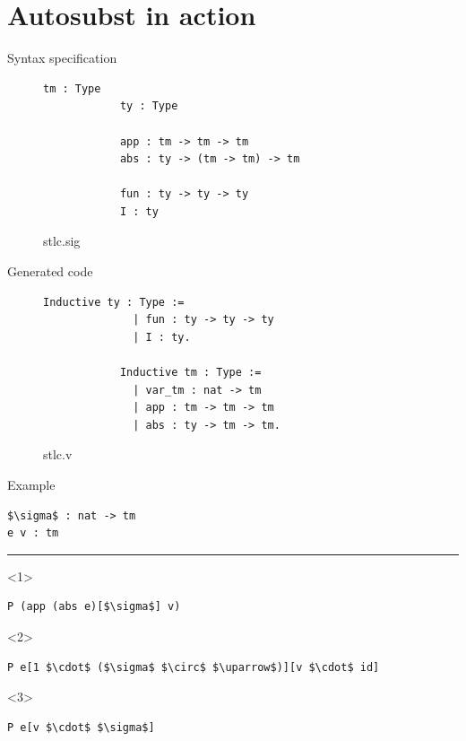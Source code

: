 \documentclass[17pt,aspectratio=169]{beamer}
\begin{document}
\section{Autosubst in action}

\begin{frame}[fragile]{Syntax specification}
    \begin{figure}[H]
        \centering
        \begin{lstlisting}[language={[Objective]Caml},basicstyle=\footnotesize\ttfamily,keywordstyle=\bfseries]
            tm : Type
            ty : Type

            app : tm -> tm -> tm
            abs : ty -> (tm -> tm) -> tm

            fun : ty -> ty -> ty
            I : ty
        \end{lstlisting}
        \caption{stlc.sig}
    \end{figure}
\end{frame}

\begin{frame}[fragile]{Generated code}
    \begin{figure}[H]
        \centering
        \begin{lstlisting}[language={[Objective]Caml},basicstyle=\footnotesize\ttfamily,keywordstyle=\bfseries]
            Inductive ty : Type :=
              | fun : ty -> ty -> ty
              | I : ty.

            Inductive tm : Type :=
              | var_tm : nat -> tm
              | app : tm -> tm -> tm
              | abs : ty -> tm -> tm.
        \end{lstlisting}
        \caption{stlc.v}
    \end{figure}
\end{frame}

\begin{frame}[fragile]{Example}
    \begin{lstlisting}[mathescape=true,basicstyle=\footnotesize\ttfamily,keywordstyle=\bfseries]
$\sigma$ : nat -> tm
e v : tm
    \end{lstlisting}
    \hrule
    \begin{onlyenv}<1>
    \begin{lstlisting}[mathescape=true,basicstyle=\footnotesize\ttfamily,keywordstyle=\bfseries]
P (app (abs e)[$\sigma$] v)
    \end{lstlisting}
    \end{onlyenv}
    \begin{onlyenv}<2>
    \begin{lstlisting}[mathescape=true,basicstyle=\footnotesize\ttfamily,keywordstyle=\bfseries]
P e[1 $\cdot$ ($\sigma$ $\circ$ $\uparrow$)][v $\cdot$ id]
    \end{lstlisting}
    \end{onlyenv}
    \begin{onlyenv}<3>
    \begin{lstlisting}[mathescape=true,basicstyle=\footnotesize\ttfamily,keywordstyle=\bfseries]
P e[v $\cdot$ $\sigma$]
    \end{lstlisting}
    \end{onlyenv}
\end{frame}
\end{document}
